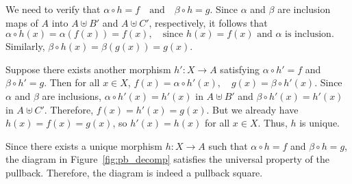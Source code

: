 We need to verify that
$
\alpha \circ h \mathop{=} f \quad \text{and} \quad \beta \circ h \mathop{=} g.
$
Since \( \alpha \) and \( \beta \) are inclusion maps of \( A \) into \( A \uplus B' \) and \( A \uplus C' \), respectively, it follows that
$
\alpha \circ h(x) \mathop{=} \alpha(f(x)) \mathop{=} f(x), \quad \text{since } h(x) \mathop{=} f(x) \text{ and } \alpha \text{ is inclusion}.
$
Similarly,
$
\beta \circ h(x) \mathop{=} \beta(g(x)) \mathop{=} g(x).
$

Suppose there exists another morphism \( h': X \mathop{\to} A \) satisfying \( \alpha \circ h' \mathop{=} f \) and \( \beta \circ h' \mathop{=} g \). Then for all \( x \mathop{\in} X \),
$
f(x) \mathop{=} \alpha \circ h'(x), \quad g(x) \mathop{=} \beta \circ h'(x).
$
Since \( \alpha \) and \( \beta \) are inclusions, \( \alpha \circ h'(x) \mathop{=} h'(x) \) in \( A \uplus B' \) and \( \beta \circ h'(x) \mathop{=} h'(x) \) in \( A \uplus C' \). Therefore,
$
f(x) \mathop{=} h'(x) \mathop{=} g(x).
$
But we already have \( h(x) \mathop{=} f(x) \mathop{=} g(x) \), so \( h'(x) \mathop{=} h(x) \) for all \( x \mathop{\in} X \). Thus, \( h \) is unique.

Since there exists a unique morphism \( h: X \mathop{\to} A \) such that \( \alpha \circ h \mathop{=} f \) and \( \beta \circ h \mathop{=} g \), the diagram in Figure~\ref{fig:pb_decomp} satisfies the universal property of the pullback. Therefore, the diagram is indeed a pullback square.